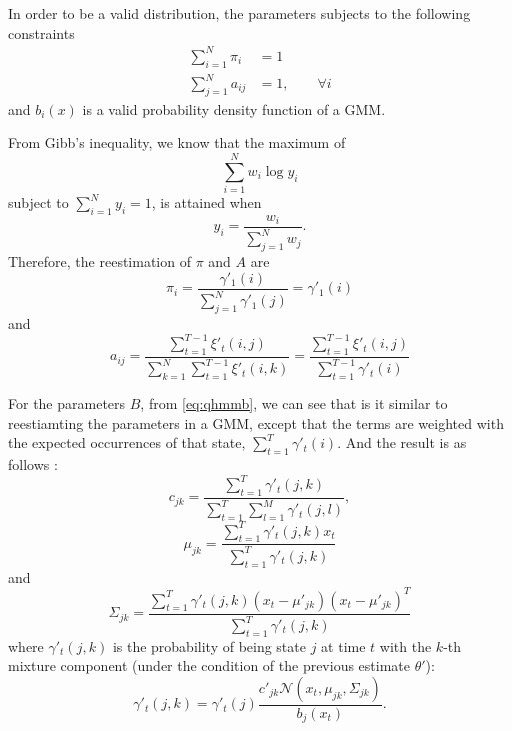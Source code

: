 \documentclass[12pt,final,twoside]{report}
\theoremstyle{plain}
\theoremstyle{definition}
\theoremstyle{remark}
\begin{document}
In order to be a valid distribution, the parameters subjects to the following constraints
\begin{align}
  \sum_{i=1}^{N} \pi_i &= 1  \\
  \sum_{j=1}^{N} a_{ij} &= 1 , \qquad \forall i 
\end{align}
and $b_i(x)$ is a valid probability density function of a GMM.

From Gibb's inequality, we know that the maximum of 
\begin{equation}
  \sum_{i=1}^N w_i \log y_i
\end{equation}
subject to $\sum_{i=1}^N y_i = 1$, is attained when
\begin{equation}
  y_i = \frac{w_i}{\sum_{j=1}^N w_j} .
\end{equation} 
Therefore, the reestimation of $\pi$ and $A$ are
\begin{equation}
  \pi_i = \frac{\gamma'_1(i)}{\sum_{j=1}^N \gamma'_1(j)} = \gamma'_1(i)
  \label{eq:hmmpi}
\end{equation} 
and
\begin{equation}
  a_{ij} = \frac{\sum_{t=1}^{T-1} \xi'_t(i,j)}{\sum_{k=1}^N \sum_{t=1}^{T-1} \xi'_t(i,k)} = \frac{\sum_{t=1}^{T-1} \xi'_t(i,j)}{\sum_{t=1}^{T-1} \gamma'_t(i)}
  \label{eq:hmma}
\end{equation} 

For the parameters $B$, from \cref{eq:qhmmb}, we can see that is it similar to reestiamting the parameters in a GMM, except that the terms are weighted with the expected occurrences of that state, $\sum_{t=1}^{T} \gamma'_t(i)$. And the result is as follows \cite{bilmes_gentle_1998}:
\begin{equation}
  c_{jk} = \frac{\sum_{t=1}^{T} \gamma'_t(j,k)}{\sum_{t=1}^{T} \sum_{l=1}^{M} \gamma'_t(j,l)},
  \label{eq:hmmc}
\end{equation}
\begin{equation}
  \mu_{jk} = \frac{\sum_{t=1}^{T} \gamma'_t(j,k) x_t}{\sum_{t=1}^{T} \gamma'_t(j,k)}
  \label{eq:hmmmu}
\end{equation}
and
\begin{equation}
  \Sigma_{jk} = \frac{\sum_{t=1}^{T} \gamma'_t(j,k) (x_t-\mu'_{jk})(x_t-\mu'_{jk})^T}{\sum_{t=1}^{T} \gamma'_t(j,k)}
  \label{eq:hmmsigma}
\end{equation}
where $\gamma'_t(j,k)$ is the probability of being state $j$ at time $t$ with the $k$-th mixture component (under the condition of the previous estimate $\theta'$):
\begin{equation}
  \gamma'_t(j,k) = \gamma'_t(j) \frac{c'_{jk} \mathcal{N}(x_t,\mu_{jk},\Sigma_{jk})} {b_j(x_t)} . \label{eq:hmmgamma2}
\end{equation}
\end{document}
